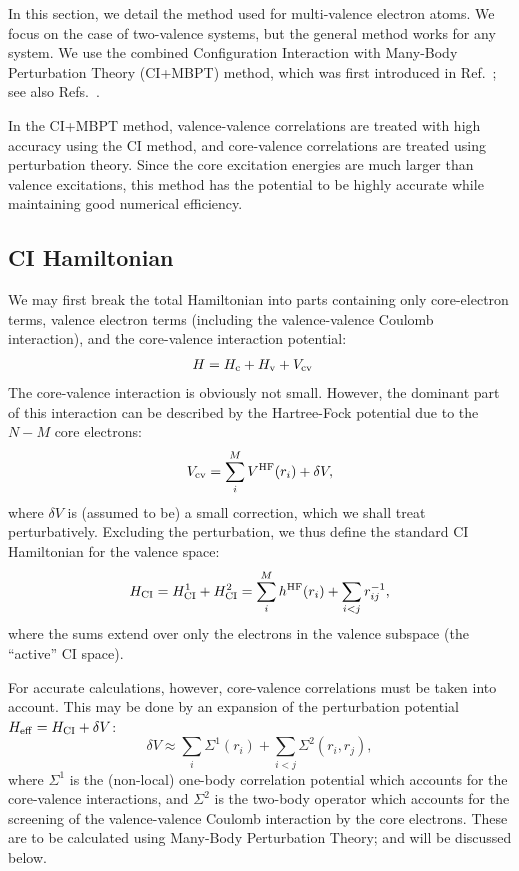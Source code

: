 \documentclass[10pt,twocolumn,a4paper]{article}%
\newcommand{\be}{\begin{equation}}
\newcommand{\ee}{\end{equation}}
\begin{document}
In this section, we detail the method used for multi-valence electron atoms. We focus on the case of two-valence systems, but the general method works for any system.
We use the combined Configuration Interaction with Many-Body Perturbation Theory (CI+MBPT) method, which was first introduced in Ref.~\cite{DzubaCIMBPT1996};
see also Refs.~\cite{DzubaCIMBPT1996,DzubaVN-M2005,AMBiT2018,Berengut2006,Kozlov2022,Kozlov2015}.

In the CI+MBPT method, valence-valence correlations are treated with high accuracy using the CI method, and core-valence correlations are treated using perturbation theory.
Since the core excitation energies are much larger than valence excitations, this method has the potential to be highly accurate while maintaining good numerical efficiency.

\subsection{CI Hamiltonian}

We may first break the total Hamiltonian into parts containing only core-electron terms, valence electron terms (including the valence-valence Coulomb interaction), and the core-valence interaction potential:
\begin{align}
H &= H_{\rm c} + H_{\rm v} + V_{\rm cv}
\end{align}
The core-valence interaction is obviously not small.
However, the dominant part of this interaction can be described by the Hartree-Fock potential due to the $N-M$ core electrons:
\be
V_{\rm cv} = \sum_i^M V^{\rm HF}(r_i) + \delta V,
\ee
where $\delta V$ is (assumed to be) a small correction, which we shall treat perturbatively.
Excluding the perturbation, we thus define the standard CI Hamiltonian for the valence space:
\be\label{eq:Hci}
    H_{\rm CI} = H_{\rm CI}^1 + H_{\rm CI}^2 = 
    \sum_i^M h^{\rm HF}(r_i)
+\sum_{i<j}r^{-1}_{ij},
\ee
where the sums extend over only the electrons in the valence subspace (the ``active'' CI space).

For accurate calculations, however, core-valence correlations must be taken into account. 
This may be done by an expansion of the perturbation potential $H_{\rm eff} = H_{\rm CI} + \delta V$:
\be\label{eq:Hci-dV}
    \delta V \approx \sum_i \Sigma^1(r_i) +\sum_{i<j}\Sigma^2(r_i,r_j),
\ee
where $\Sigma^1$ is the (non-local) one-body correlation potential which accounts for the core-valence interactions, and $\Sigma^2$ is the two-body operator which accounts for the screening of the valence-valence Coulomb interaction by the core electrons.
These are to be calculated using Many-Body Perturbation Theory; and will be discussed below.
\end{document}

